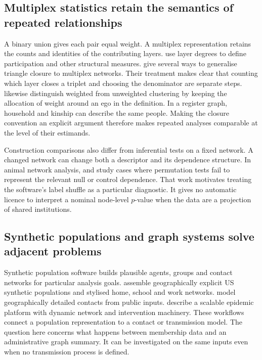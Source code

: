\subsection{Multiplex statistics retain the semantics of repeated relationships}

A binary union gives each pair equal weight. A multiplex representation retains the counts and identities of the contributing layers. \citet{battiston2014} use layer degrees to define participation and other structural measures. \citet{cozzo2015} give several ways to generalise triangle closure to multiplex networks. Their treatment makes clear that counting which layer closes a triplet and choosing the denominator are separate steps. \citet{barrat2004} likewise distinguish weighted from unweighted clustering by keeping the allocation of weight around an ego in the definition. In a register graph, household and kinship can describe the same people. Making the closure convention an explicit argument therefore makes repeated analyses comparable at the level of their estimands.

Construction comparisons also differ from inferential tests on a fixed network. A changed network can change both a descriptor and its dependence structure. In animal network analysis, \citet{farine2022} and \citet{hart2022} study cases where permutation tests fail to represent the relevant null or control dependence. That work motivates treating the software's label shuffle as a particular diagnostic. It gives no automatic licence to interpret a nominal node-level $p$-value when the data are a projection of shared institutions.

\subsection{Synthetic populations and graph systems solve adjacent problems}

Synthetic population software builds plausible agents, groups and contact networks for particular analysis goals. \citet{jiang2024} assemble geographically explicit US synthetic populations and stylised home, school and work networks. \citet{tulchinsky2026} model geographically detailed contacts from public inputs. \citet{chen2025} describe a scalable epidemic platform with dynamic network and intervention machinery. These workflows connect a population representation to a contact or transmission model. The question here concerns what happens between membership data and an administrative graph summary. It can be investigated on the same inputs even when no transmission process is defined.

